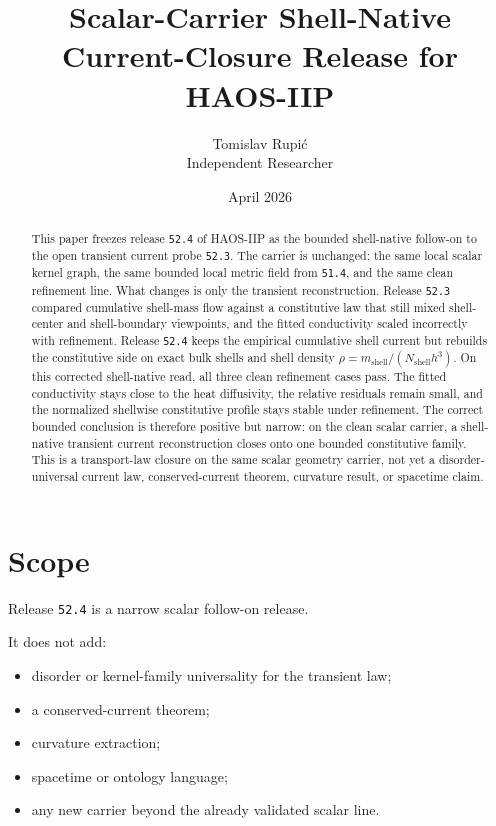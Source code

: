 \documentclass[11pt]{article}
\title{Scalar-Carrier Shell-Native Current-Closure Release for HAOS-IIP}
\author{Tomislav Rupi\'c \\ Independent Researcher}
\date{April 2026}
\begin{document}
\maketitle

\begin{abstract}
This paper freezes release \texttt{52.4} of HAOS-IIP as the bounded shell-native follow-on to the open transient current probe \texttt{52.3}. The carrier is unchanged: the same local scalar kernel graph, the same bounded local metric field from \texttt{51.4}, and the same clean refinement line. What changes is only the transient reconstruction. Release \texttt{52.3} compared cumulative shell-mass flow against a constitutive law that still mixed shell-center and shell-boundary viewpoints, and the fitted conductivity scaled incorrectly with refinement. Release \texttt{52.4} keeps the empirical cumulative shell current but rebuilds the constitutive side on exact bulk shells and shell density \(\rho = m_{\mathrm{shell}} / (N_{\mathrm{shell}} h^3)\). On this corrected shell-native read, all three clean refinement cases pass. The fitted conductivity stays close to the heat diffusivity, the relative residuals remain small, and the normalized shellwise constitutive profile stays stable under refinement. The correct bounded conclusion is therefore positive but narrow: on the clean scalar carrier, a shell-native transient current reconstruction closes onto one bounded constitutive family. This is a transport-law closure on the same scalar geometry carrier, not yet a disorder-universal current law, conserved-current theorem, curvature result, or spacetime claim.
\end{abstract}

\tableofcontents

\section{Scope}

Release \texttt{52.4} is a narrow scalar follow-on release.

It does not add:
\begin{itemize}
\item disorder or kernel-family universality for the transient law;
\item a conserved-current theorem;
\item curvature extraction;
\item spacetime or ontology language;
\item any new carrier beyond the already validated scalar line.
\end{itemize}
\end{document}
